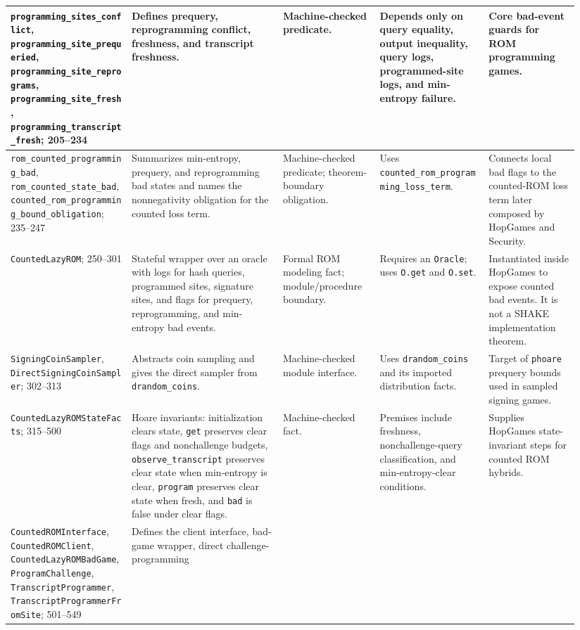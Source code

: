 \documentclass[11pt]{report}
\DeclareRobustCommand{\ec}[1]{\ifmmode\text{\nolinkurl{#1}}\else\nolinkurl{#1}\fi}
\theoremstyle{definition}
\theoremstyle{plain}
\begin{document}
\begin{longtable}{p{0.20\linewidth}p{0.25\linewidth}p{0.16\linewidth}p{0.18\linewidth}p{0.15\linewidth}}
\ec{programming\_sites\_conflict},
\ec{programming\_site\_prequeried},
\ec{programming\_site\_reprograms},
\ec{programming\_site\_fresh},
\ec{programming\_transcript\_fresh}; 205--234 &
Defines prequery, reprogramming conflict, freshness, and transcript freshness. &
Machine-checked predicate. &
Depends only on query equality, output inequality, query logs, programmed-site
logs, and min-entropy failure. &
Core bad-event guards for ROM programming games. \\
\midrule
\ec{rom\_counted\_programming\_bad},
\ec{rom\_counted\_state\_bad},
\ec{counted\_rom\_programming\_bound\_obligation}; 235--247 &
Summarizes min-entropy, prequery, and reprogramming bad states and names the
nonnegativity obligation for the counted loss term. &
Machine-checked predicate; theorem-boundary obligation. &
Uses \ec{counted\_rom\_programming\_loss\_term}. &
Connects local bad flags to the counted-ROM loss term later composed by
HopGames and Security. \\
\midrule
\ec{CountedLazyROM}; 250--301 &
Stateful wrapper over an oracle with logs for hash queries, programmed sites,
signature sites, and flags for prequery, reprogramming, and min-entropy bad
events. &
Formal ROM modeling fact; module/procedure boundary. &
Requires an \ec{Oracle}; uses \ec{O.get} and \ec{O.set}. &
Instantiated inside HopGames to expose counted bad events.  It is not a SHAKE
implementation theorem. \\
\midrule
\ec{SigningCoinSampler}, \ec{DirectSigningCoinSampler}; 302--313 &
Abstracts coin sampling and gives the direct sampler from \ec{drandom\_coins}. &
Machine-checked module interface. &
Uses \ec{drandom\_coins} and its imported distribution facts. &
Target of \ec{phoare} prequery bounds used in sampled signing games. \\
\midrule
\ec{CountedLazyROMStateFacts}; 315--500 &
Hoare invariants: initialization clears state, \ec{get} preserves clear flags
and nonchallenge budgets, \ec{observe\_transcript} preserves clear state when
min-entropy is clear, \ec{program} preserves clear state when fresh, and
\ec{bad} is false under clear flags. &
Machine-checked fact. &
Premises include freshness, nonchallenge-query classification, and
min-entropy-clear conditions. &
Supplies HopGames state-invariant steps for counted ROM hybrids. \\
\midrule
\ec{CountedROMInterface}, \ec{CountedROMClient},
\ec{CountedLazyROMBadGame}, \ec{ProgramChallenge},
\ec{TranscriptProgrammer}, \ec{TranscriptProgrammerFromSite}; 501--549 &
Defines the client interface, bad-game wrapper, direct challenge-programming

\end{longtable}
\end{document}
